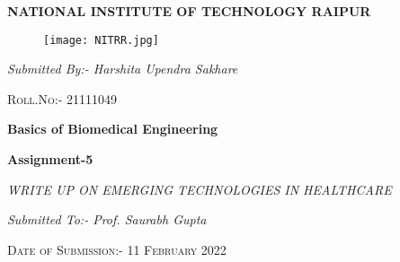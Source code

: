 \documentclass[12pt,a4paper]{article}
\begin{document}


\begin{center}
\textbf{NATIONAL INSTITUTE OF TECHNOLOGY RAIPUR}
\end{center}


\begin{figure}[h]
\centering
\texttt{[image: NITRR.jpg]}
\end{figure}

\hspace{1cm}

\begin{center}
\textit{\Large Submitted By:- Harshita Upendra Sakhare}
\end{center}


\hspace{1cm}

\begin{center}
\textsc{\large Roll.No:- 21111049}
\end{center}

\hspace{1cm}

\begin{center}
\textbf{\large Basics of Biomedical Engineering}
\end{center}


\begin{center}
\textbf{\large Assignment-5}
\end{center}

\begin{center}
\textsl{\large WRITE UP ON EMERGING TECHNOLOGIES IN HEALTHCARE}
\end{center}

\hspace{1cm}

\begin{center}
\textit{\Large Submitted To:- Prof. Saurabh Gupta}
\end{center}

\hspace{1cm}

\begin{center}
\textsc{Date of Submission:- 11 February 2022 }
\end{center}
\end{document}
